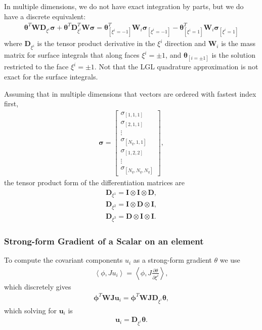 \documentclass{report}
\newcommand{\inner}[2]{ \left\langle #1, #2 \right\rangle }
\newcommand{\mat}[1]{\boldsymbol #1}
\newcommand{\dvec}[1]{\boldsymbol #1}
\begin{document}
In multiple dimensions, we do not have exact integration by parts, but we do have a discrete equivalent:
\begin{align}
   \dvec{\theta}^{T} \mat{W} \mat{D}_{\xi^i} \dvec{\sigma} + \dvec{\theta}^{T} \mat{D}_{\xi^i}^{T} \mat{W} \dvec{\sigma}
   =
   \dvec{\theta}_{[\xi^i=-1]}^{T} \mat{W}_{i} \dvec{\sigma}_{[\xi^i=-1]}
   -
   \dvec{\theta}_{[\xi^i=1]}^{T} \mat{W}_{i} \dvec{\sigma}_{[\xi^i=1]}
\end{align}
where $\mat{D}_{\xi^i}$ is the tensor product derivative in the $\xi^{i}$ direction
and $\mat{W}_{i}$ is the mass matrix for surface integrals that along faces $\xi^{i} = \pm 1$,
and
$\dvec{\theta}_{[i=\pm1]}$ is the solution restricted to the face $\xi^{i} = \pm 1$.
Not that the LGL quadrature approximation is not exact for the surface integrals.

Assuming that in multiple dimensions that vectors are ordered with fastest index first,
\begin{align}
   \dvec{\sigma} =
   \begin{bmatrix}
   \sigma_{[1,1,1]}\\
   \sigma_{[2,1,1]}\\
   \vdots\\
   \sigma_{[N_q, 1, 1]}\\
   \sigma_{[1, 2, 2]}\\
   \vdots\\
   \sigma_{[N_q, N_q, N_q]}
   \end{bmatrix},
\end{align}
the tensor product form of the differentiation matrices are
\begin{align}
    \mat{D}_{\xi^1} = \mat{I} \otimes \mat{I} \otimes \mat{D},\\
    \mat{D}_{\xi^2} = \mat{I} \otimes \mat{D} \otimes \mat{I},\\
    \mat{D}_{\xi^3} = \mat{D} \otimes \mat{I} \otimes \mat{I}.
\end{align}

\subsubsection*{Strong-form Gradient of a Scalar on an element}
To compute the covariant components $u_{i}$ as a strong-form gradient $\theta$ we use
\begin{align}
    \inner{\phi}{J u_{i}} =  \inner{\phi}{J \frac{\partial \theta}{\partial \xi^{i}}},
\end{align}
which discretely gives
\begin{align}
    \dvec{\phi}^{T} \mat{W} \mat{J} \dvec{u}_{i} =   \dvec{\phi}^{T} \mat{W} \mat{J} \mat{D}_{\xi^i} \dvec{\theta},
\end{align}
which solving for $\dvec{u}_{i}$ is
\begin{align}
    \dvec{u}_{i} = \mat{D}_{\xi^i} \dvec{\theta}.
\end{align}
\end{document}
